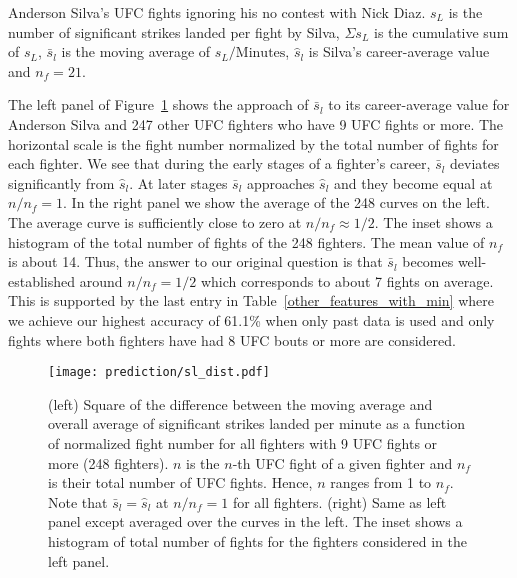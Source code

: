 \begin{center}
\begin{table}[h]

\caption{Anderson Silva's UFC fights ignoring his no contest with Nick Diaz. $s_L$ is the number
of significant strikes landed per fight by Silva, $\Sigma s_L$ is the cumulative
sum of $s_L$, $\bar{s}_l$ is the moving average of $s_L/\textrm{Minutes}$,
$\hat{s}_l$ is Silva's career-average value and $n_f=21$.}
\label{anderson_running_ave}
\end{table}
\end{center}

The left panel of Figure~\ref{normalized_sl_dist} shows the approach of
$\bar{s}_l$ to its career-average value for Anderson Silva and 247 other
UFC fighters who have 9 UFC fights or more. The horizontal
scale is the fight number normalized by the total number of fights for
each fighter. We see that during the early stages of a fighter's career, $\bar{s}_l$ deviates
significantly from $\hat{s}_l$. At later stages $\bar{s}_l$
approaches $\hat{s}_l$ and they become equal at $n/n_f=1$.
In the right panel we show the average of the 248 curves
on the left. The average curve is sufficiently close to zero at $n/n_f \approx 1/2$.
The inset shows a histogram of the total number of fights of the 248 fighters. The
mean value of $n_f$ is about 14.
Thus,
the answer to our original question is that $\bar{s}_l$ becomes
well-established around
$n/n_f=1/2$ which corresponds to about 7 fights on average. This is supported
by the last entry in Table~\ref{other_features_with_min} where we achieve our highest
accuracy of 61.1\% when only past data is used and 
only fights where both fighters have
had 8 UFC bouts or more are considered.

\begin{figure}[h]
\begin{center}
\texttt{[image: prediction/sl\_dist.pdf]}
\caption{(left) Square of the difference between the moving average
and overall average of significant strikes landed per minute as
a function of normalized fight number for all fighters with
9 UFC fights or more (248 fighters). $n$ is the $n$-th UFC fight of
a given fighter and $n_f$ is their total number of UFC fights. Hence,
$n$ ranges from 1 to $n_f$.
Note that $\bar{s}_l=\hat{s}_l$ at $n/n_f=1$ for all fighters.
(right) Same as left panel except averaged over the curves in the left.
The inset shows a histogram of total number of fights for the
fighters considered in the left panel.}
\label{normalized_sl_dist}
\end{center}
\end{figure}

